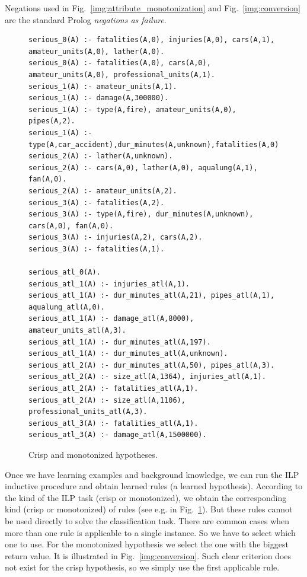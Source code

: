Negations used in Fig.~\ref{img:attribute_monotonization} and Fig.~\ref{img:conversion} are the standard Prolog \emph{negations as failure}.


\begin{figure}[bht]
\begin{verbatim}
serious_0(A) :- fatalities(A,0), injuries(A,0), cars(A,1), amateur_units(A,0), lather(A,0).
serious_0(A) :- fatalities(A,0), cars(A,0), amateur_units(A,0), professional_units(A,1).
serious_1(A) :- amateur_units(A,1).
serious_1(A) :- damage(A,300000).
serious_1(A) :- type(A,fire), amateur_units(A,0), pipes(A,2).
serious_1(A) :- type(A,car_accident),dur_minutes(A,unknown),fatalities(A,0),injuries(A,1).
serious_2(A) :- lather(A,unknown).
serious_2(A) :- cars(A,0), lather(A,0), aqualung(A,1), fan(A,0).
serious_2(A) :- amateur_units(A,2).
serious_3(A) :- fatalities(A,2).
serious_3(A) :- type(A,fire), dur_minutes(A,unknown), cars(A,0), fan(A,0).
serious_3(A) :- injuries(A,2), cars(A,2).
serious_3(A) :- fatalities(A,1).

serious_atl_0(A).
serious_atl_1(A) :- injuries_atl(A,1).
serious_atl_1(A) :- dur_minutes_atl(A,21), pipes_atl(A,1), aqualung_atl(A,0).
serious_atl_1(A) :- damage_atl(A,8000), amateur_units_atl(A,3).
serious_atl_1(A) :- dur_minutes_atl(A,197).
serious_atl_1(A) :- dur_minutes_atl(A,unknown).
serious_atl_2(A) :- dur_minutes_atl(A,50), pipes_atl(A,3).
serious_atl_2(A) :- size_atl(A,1364), injuries_atl(A,1).
serious_atl_2(A) :- fatalities_atl(A,1).
serious_atl_2(A) :- size_atl(A,1106), professional_units_atl(A,3).
serious_atl_3(A) :- fatalities_atl(A,1).
serious_atl_3(A) :- damage_atl(A,1500000).
\end{verbatim}
\caption{Crisp and monotonized hypotheses.}
\label{img:rules}
\end{figure}


Once we have learning examples and background knowledge, we can run the ILP inductive procedure and obtain learned rules (a learned hypothesis). According to the kind of the ILP task (crisp or monotonized), we obtain the corresponding kind (crisp or monotonized) of rules (see e.g. in Fig.~\ref{img:rules}). But these rules cannot be used directly to solve the classification task. There are common cases when more than one rule is applicable to a single instance. So we have to select which one to use. For the monotonized hypothesis we select the one with the biggest return value. It is illustrated in Fig.~\ref{img:conversion}. Such clear criterion does not exist for the crisp hypothesis, so we simply use the first applicable rule.


